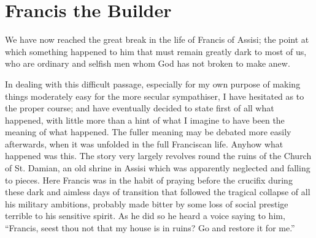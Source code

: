 \documentclass{book}
\begin{document}
\chapter{Francis the Builder}
\label{chapter-3}
We have now reached the great break in the life of Francis of Assisi; the point at which something happened to him that must remain greatly dark to most of us, who are ordinary and selfish men whom God has not broken to make anew.

In dealing with this difficult passage, especially for my own purpose of making things moderately easy for the more secular sympathiser, I have hesitated as to the proper course; and have eventually decided to state first of all what happened, with little more than a hint of what I imagine to have been the meaning of what happened. The fuller meaning may be debated more easily afterwards, when it was unfolded in the full Franciscan life. Anyhow what happened was this. The story very largely revolves round the ruins of the Church of St. Damian, an old shrine in Assisi which was apparently neglected and falling to pieces. Here Francis was in the habit of praying before the crucifix during these dark and aimless days of transition that followed the tragical collapse of all his military ambitions, probably made bitter by some loss of social prestige terrible to his sensitive spirit. As he did so he heard a voice saying to him, “Francis, seest thou not that my house is in ruins? Go and restore it for me.”
\end{document}

